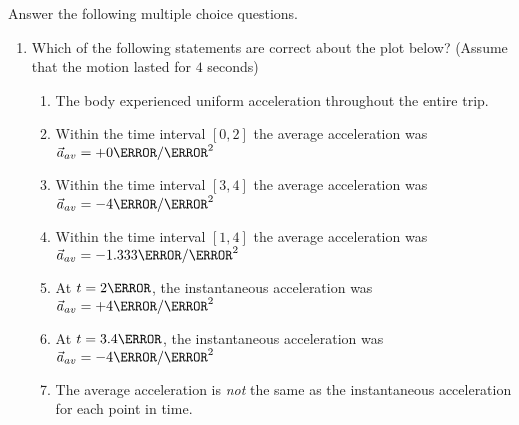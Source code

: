 \documentclass[12pt]{article} %
\newcommand{\tx}[1]{\text{#1}}
\begin{document}
 \begin{qstn}[2]
    Answer the following multiple choice questions.
    \begin{enumerate}
        \item Which of the following statements are correct about the plot below? (Assume that the motion lasted for $4$ seconds)
    \begin{center}
    \end{center}
    
    
            \begin{enumerate}[label = (\alph*)]
                \item The body experienced uniform acceleration throughout the entire trip.
                \item Within the time interval $[0,2]$ the average acceleration was $\vec a_{av} = +0 \m / \s^2$
                \item Within the time interval $[3,4]$ the average acceleration was $\vec a_{av} = -4 \m / \s^2$
                \item Within the time interval $[1,4]$ the average acceleration was $\vec a_{av} = -1.333 \m / \s^2$
                \item At $t = 2\s$, the instantaneous acceleration was $\vec a_{av} = +4 \m / \s^2$
                \item At $t = 3.4\s$, the instantaneous acceleration was $\vec a_{av} = -4 \m / \s^2$
                \item The average acceleration is \emph{not} the same as the instantaneous acceleration for each point in time.
            \end{enumerate}


\end{enumerate}
\end{qstn}
\end{document}
